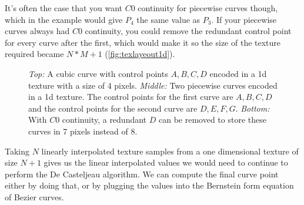 \documentclass{jcgt}
\begin{document}
It's often the case that you want $C0$ continuity for piecewise curves though, which in the example would give $P_4$ the same value as $P_3$.  If your piecewise curves always had $C0$ continuity, you could remove the redundant control point for every curve after the first, which would make it so the size of the texture required became $N*M+1$ (\autoref{fig:texlayeout1d}).

  \begin{figure}

    \vspace{5mm}


    \vspace{5mm}

    \caption{\textit{Top:} A cubic curve with control points $A,B,C,D$ encoded in a 1d texture with a size of 4 pixels.  \textit{Middle:} Two piecewise curves encoded in a 1d texture.  The control points for the first curve are $A,B,C,D$ and the control points for the second curve are $D,E,F,G$.  \textit{Bottom:} With $C0$ continuity, a redundant $D$ can be removed to store these curves in 7 pixels instead of 8. }    
    \label{fig:texlayeout1d}
  \end{figure}

Taking $N$ linearly interpolated texture samples from a one dimensional texture of size $N+1$ gives us the linear interpolated values we would need to continue to perform the De Casteljeau algorithm.  We can compute the final curve point either by doing that, or by plugging the values into the Bernstein form equation of Bezier curves.
\end{document}
